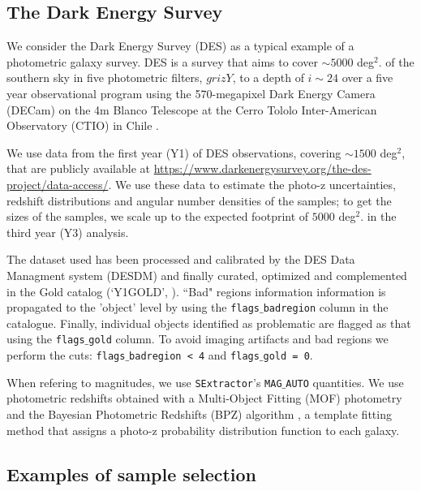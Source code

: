 \documentclass[a4paper,fleqn,usenatbib]{mnras}
\begin{document}
\subsection{The Dark Energy Survey}


We consider the Dark Energy Survey (DES) as a typical example of a photometric galaxy survey. DES is a  survey that aims to cover $\sim 5000$  deg$^2$. of the southern sky in five photometric filters, $grizY$, to a depth of $i \sim 24$ over a five year observational program using the 570-megapixel Dark Energy Camera (DECam) on the 4m Blanco Telescope at the Cerro Tololo Inter-American Observatory (CTIO) in Chile \citep{Flauger2015}.

We use data from the first year (Y1) of DES observations, covering $\sim 1500$ deg$^2$, that are publicly available at  \url{https://www.darkenergysurvey.org/the-des-project/data-access/}. We use these data to estimate the photo-z uncertainties, redshift distributions and angular number densities of the samples; to get the sizes of the samples, we scale up to the expected footprint of $5000$  deg$^2$. in the third year (Y3) analysis.

The dataset used has been processed and calibrated by the DES Data Managment system (DESDM) \citep{Sevilla2011} and finally curated, optimized and complemented in the Gold catalog (`Y1GOLD', \citealt{Drlica2018}). ``Bad" regions information information is propagated to the 'object' level by using the \texttt{flags{$\_$}badregion} column in the catalogue. Finally, individual objects identified as problematic are flagged as that using the \texttt{flags{$\_$}gold} column. To avoid imaging artifacts and bad regions we perform the cuts: \texttt{flags{$\_$}badregion < 4} and \texttt{flags{$\_$}gold = 0}.

When refering to magnitudes, we use \texttt{SExtractor}'s \citep{Bertin1996}  \texttt{MAG{$\_$}AUTO} quantities. We use photometric redshifts obtained with a Multi-Object Fitting (MOF) photometry \citep[section 6.3]{Drlica2018} and the Bayesian Photometric Redshifts (BPZ) algorithm \citep{Benitez}, a template fitting method that assigns a photo-z probability distribution function to each galaxy.



\subsection{Examples of sample selection}
\label{subsec: Sample_Selection}
\end{document}
